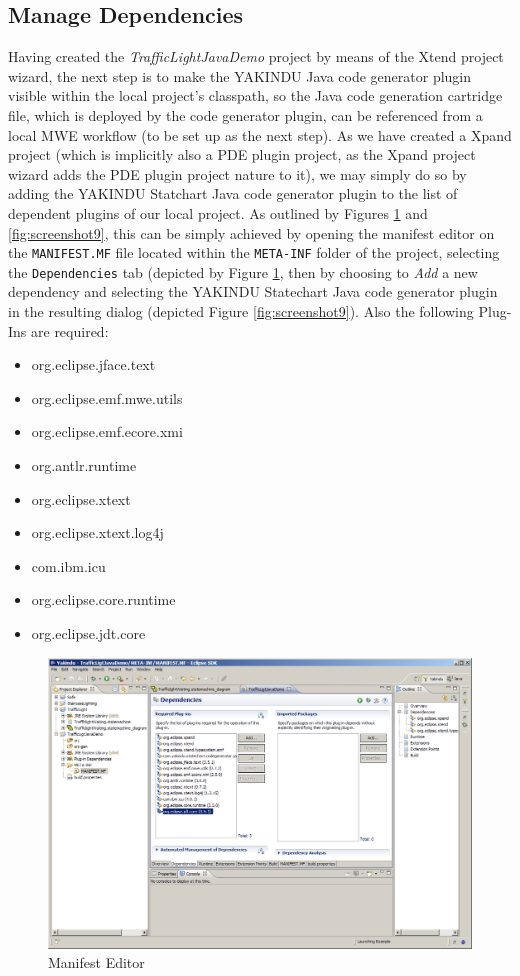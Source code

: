 \subsection{Manage Dependencies}
Having created the \emph{TrafficLightJavaDemo} project by means of the Xtend
project wizard, the next step is to make the YAKINDU Java code generator plugin
visible within the local project's classpath, so the Java code generation
cartridge file, which is deployed by the code generator plugin, can be
referenced from a local MWE workflow (to be set up as the next step). As we
have created a Xpand project (which is implicitly also a PDE plugin project, as
the Xpand project wizard adds the PDE plugin project nature to it), we may simply
do so by adding the YAKINDU Statchart Java code generator plugin to the list of
dependent plugins of our local project. As outlined by Figures
\ref{fig:screenshot8} and \ref{fig:screenshot9}, this can be simply achieved by
opening the manifest editor on the \texttt{MANIFEST.MF} file located within the
\texttt{META-INF} folder of the project, selecting the \texttt{Dependencies}
tab (depicted by Figure \ref{fig:screenshot8}, then by choosing to \emph{Add} a
new dependency and selecting the YAKINDU Statechart Java code generator
plugin in the resulting dialog (depicted Figure \ref{fig:screenshot9}).
Also the following Plug-Ins are required:
\begin{itemize}
\item org.eclipse.jface.text
\item org.eclipse.emf.mwe.utils
\item org.eclipse.emf.ecore.xmi
\item org.antlr.runtime
\item org.eclipse.xtext
\item org.eclipse.xtext.log4j
\item com.ibm.icu
\item org.eclipse.core.runtime
\item org.eclipse.jdt.core
\end{itemize}

\begin{figure}[h!]
\center
\includegraphics[width=\textwidth]{./Pictures/Screenshot8}
\caption{\label{fig:screenshot8} Manifest Editor}
\end{figure}

